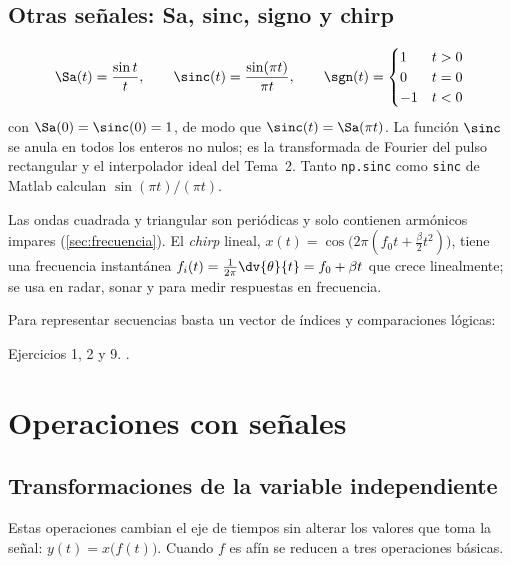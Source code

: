\documentclass[11pt,a4paper]{scrartcl}
\begin{document}
\subsection{Otras señales: Sa, sinc, signo y chirp}

\[
  \Sa(t)=\frac{\sin t}{t},\qquad \sinc(t)=\frac{\sin(\pi t)}{\pi t},\qquad
  \sgn(t)=\begin{cases}1 & t>0\\0 & t=0\\-1 & t<0\end{cases}
\]
con $\Sa(0)=\sinc(0)=1$, de modo que $\sinc(t)=\Sa(\pi t)$. La función $\sinc$ se anula en todos los enteros no nulos; es la transformada de Fourier del pulso rectangular y el interpolador ideal del Tema~2. Tanto \texttt{np.sinc} como \texttt{sinc} de Matlab calculan $\sin(\pi t)/(\pi t)$.

Las ondas cuadrada y triangular son periódicas y solo contienen armónicos impares (\cref{sec:frecuencia}). El \emph{chirp} lineal, $x(t)=\cos\big(2\pi(f_0t+\tfrac\beta2t^2)\big)$, tiene una frecuencia instantánea $f_i(t)=\frac{1}{2\pi}\dv{\theta}{t}=f_0+\beta t$ que crece linealmente; se usa en radar, sonar y para medir respuestas en frecuencia.

\begin{encodigo}
  Para representar secuencias basta un vector de índices y comparaciones lógicas:
\end{encodigo}

\begin{flushright}\small\color{pdsgris}Ejercicios 1, 2 y 9. .\end{flushright}

\section{Operaciones con señales}\label{sec:operaciones}

\subsection{Transformaciones de la variable independiente}

Estas operaciones cambian el eje de tiempos sin alterar los valores que toma la señal: $y(t)=x\big(f(t)\big)$. Cuando $f$ es afín se reducen a tres operaciones básicas.
\end{document}
